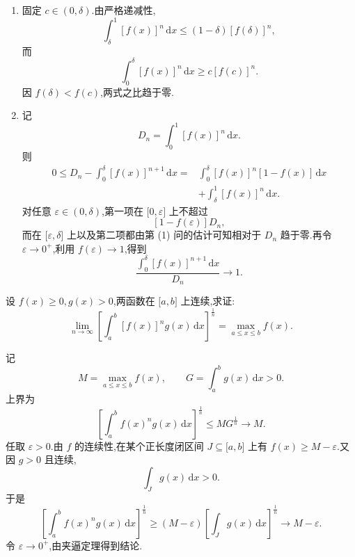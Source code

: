 \begin{solution}
    \leavevmode
    \begin{enumerate}
        \item 固定 $c\in(0,\delta)$.由严格递减性,
              \[
                  \displaystyle\int_\delta^1[f(x)]^n\,\mathrm{d}x
                  \leq(1-\delta)[f(\delta)]^n,
              \]
              而
              \[
                  \displaystyle\int_0^\delta[f(x)]^n\,\mathrm{d}x
                  \geq c[f(c)]^n.
              \]
              因 $f(\delta)<f(c)$,两式之比趋于零.

        \item 记
              \[
                  D_n=\int_0^1[f(x)]^n\,\mathrm{d}x.
              \]
              则
              \[
                  \begin{aligned}
                      0\leq D_n-\int_0^\delta[f(x)]^{n+1}\,\mathrm{d}x
                      ={} & \int_0^\delta[f(x)]^n[1-f(x)]\,\mathrm{d}x \\
                          & +\int_\delta^1[f(x)]^n\,\mathrm{d}x.
                  \end{aligned}
              \]
              对任意 $\varepsilon\in(0,\delta)$,第一项在 $\lbrack0,\varepsilon\rbrack$ 上不超过
              \[
                  [1-f(\varepsilon)]D_n,
              \]
              而在 $\lbrack\varepsilon,\delta\rbrack$ 上以及第二项都由第 (1) 问的估计可知相对于 $D_n$ 趋于零.再令 $\varepsilon\to0^+$,利用 $f(\varepsilon)\to1$,得到
              \[
                  \dfrac{\displaystyle\int_0^\delta[f(x)]^{n+1}\,\mathrm{d}x}{D_n}
                  \longrightarrow1.
              \]
    \end{enumerate}
\end{solution}

\begin{example}[\markstar]
    设 $f(x)\geq0,g(x)>0$,两函数在 $\lbrack a,b\rbrack$ 上连续,求证:
    \[
        \displaystyle\lim\limits_{n\to\infty}
        \left[\int_a^b[f(x)]^n g(x)\,\mathrm{d}x\right]^{\frac{1}{n}}
        =\max\limits_{a\leq x\leq b}f(x).
    \]
\end{example}
\exampleblank

\begin{solution}
    记
    \[
        M=\max\limits_{a\leq x\leq b}f(x),
        \qquad
        G=\int_a^b g(x)\,\mathrm{d}x>0.
    \]
    上界为
    \[
        \left[\int_a^b f(x)^ng(x)\,\mathrm{d}x\right]^{\frac{1}{n}}
        \leq M G^{\frac{1}{n}}\longrightarrow M.
    \]
    任取 $\varepsilon>0$.由 $f$ 的连续性,在某个正长度闭区间 $J\subseteq\lbrack a,b\rbrack$ 上有 $f(x)\geq M-\varepsilon$.又因 $g>0$ 且连续,
    \[
        \displaystyle\int_Jg(x)\,\mathrm{d}x>0.
    \]
    于是
    \[
        \left[\int_a^b f(x)^ng(x)\,\mathrm{d}x\right]^{\frac{1}{n}}
        \geq(M-\varepsilon)
        \left[\int_Jg(x)\,\mathrm{d}x\right]^{\frac{1}{n}}
        \longrightarrow M-\varepsilon.
    \]
    令 $\varepsilon\to0^+$,由夹逼定理得到结论.
\end{solution}

